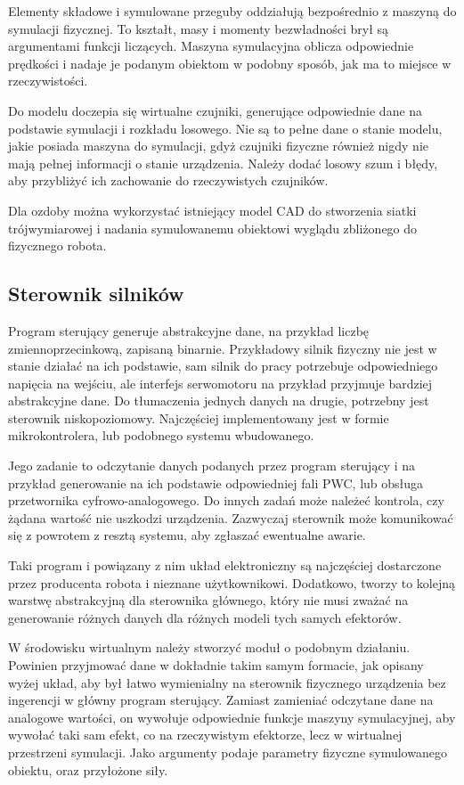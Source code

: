 	Elementy składowe i symulowane przeguby oddziałują bezpośrednio z maszyną do symulacji fizycznej. 
	To kształt, masy i momenty bezwładności brył są argumentami funkcji liczących.
	Maszyna symulacyjna oblicza odpowiednie prędkości i nadaje je podanym obiektom w podobny sposób, jak ma to miejsce w rzeczywistości.

	Do modelu doczepia się wirtualne czujniki, generujące odpowiednie dane na podstawie symulacji i rozkładu losowego.
	Nie są to pełne dane o stanie modelu, jakie posiada maszyna do symulacji, gdyż czujniki fizyczne również nigdy nie mają pełnej informacji o stanie urządzenia.
	Należy dodać losowy szum i błędy, aby przybliżyć ich zachowanie do rzeczywistych czujników.

	Dla ozdoby można wykorzystać istniejący model CAD do stworzenia siatki trójwymiarowej i nadania symulowanemu obiektowi wyglądu zbliżonego do fizycznego robota.

	\subsection{Sterownik silników}
	Program sterujący generuje abstrakcyjne dane, na przykład liczbę zmiennoprzecinkową, zapisaną binarnie.
	Przykładowy silnik fizyczny nie jest w stanie działać na ich podstawie, sam silnik do pracy potrzebuje odpowiedniego napięcia na wejściu,
	ale interfejs serwomotoru na przykład przyjmuje bardziej abstrakcyjne dane.
	Do tłumaczenia jednych danych na drugie, potrzebny jest sterownik niskopoziomowy.
	Najczęściej implementowany jest w formie mikrokontrolera, lub podobnego systemu wbudowanego.

	Jego zadanie to odczytanie danych podanych przez program sterujący i na przykład generowanie na ich podstawie odpowiedniej fali PWC, lub obsługa przetwornika cyfrowo-analogowego.
	Do innych zadań może należeć kontrola, czy żądana wartość nie uszkodzi urządzenia.
	Zazwyczaj sterownik może komunikować się z powrotem z resztą systemu, aby zgłaszać ewentualne awarie.

	Taki program i powiązany z nim układ elektroniczny są najczęściej dostarczone przez producenta robota i nieznane użytkownikowi.
	Dodatkowo, tworzy to kolejną warstwę abstrakcyjną dla sterownika głównego, który nie musi zważać na generowanie różnych danych dla różnych modeli tych samych efektorów.
	
	W środowisku wirtualnym należy stworzyć moduł o podobnym działaniu.
	Powinien przyjmować dane w dokładnie takim samym formacie, jak opisany wyżej układ, aby był łatwo wymienialny na sterownik fizycznego urządzenia bez ingerencji w główny program sterujący.
	Zamiast zamieniać odczytane dane na analogowe wartości, on wywołuje odpowiednie funkcje maszyny symulacyjnej, aby wywołać taki sam efekt, co na rzeczywistym efektorze, lecz w wirtualnej przestrzeni symulacji.
	Jako argumenty podaje parametry fizyczne symulowanego obiektu, oraz przyłożone siły.
	

